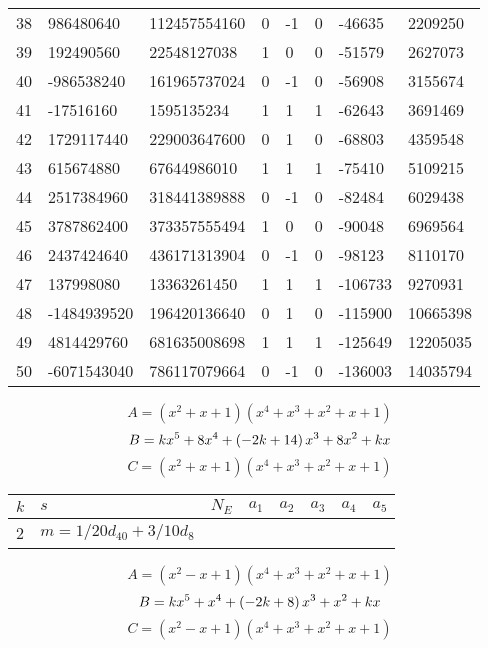 \documentclass{amsart}
\begin{document}
\begin{longtable}{|l|l|l|lllll|}
38&986480640&112457554160&0&-1&0&-46635&2209250\\
39&192490560&22548127038&1&0&0&-51579&2627073\\
40&-986538240&161965737024&0&-1&0&-56908&3155674\\
41&-17516160&1595135234&1&1&1&-62643&3691469\\
42&1729117440&229003647600&0&1&0&-68803&4359548\\
43&615674880&67644986010&1&1&1&-75410&5109215\\
44&2517384960&318441389888&0&-1&0&-82484&6029438\\
45&3787862400&373357555494&1&0&0&-90048&6969564\\
46&2437424640&436171313904&0&-1&0&-98123&8110170\\
47&137998080&13363261450&1&1&1&-106733&9270931\\
48&-1484939520&196420136640&0&1&0&-115900&10665398\\
49&4814429760&681635008698&1&1&1&-125649&12205035\\
50&-6071543040&786117079664&0&-1&0&-136003&14035794\\
\hline
\end{longtable}
$$A=(x^2
 + x
 + 1)(x^4
 + x^3
 + x^2
 + x
 + 1)$$
$$B=k\*x^5
 + 8\*x^4
 + \left(-2\*k
 + 14\right) \*x^3
 + 8\*x^2
 + k\*x$$
$$C=(x^2
 + x
 + 1)(x^4
 + x^3
 + x^2
 + x
 + 1)$$
\begin{longtable}{|l|l|l|lllll|}
\hline
$k$ & $s$ & $N_E$ & $a_1$ & $a_2$ & $a_3$ & $a_4$ & $a_5$\\
\hline
2&$m=1/20d_{40}+3/10d_{8}$&&\multicolumn{5}{c|}{}\\
\hline
\end{longtable}
$$A=(x^2
 - x
 + 1)(x^4
 + x^3
 + x^2
 + x
 + 1)$$
$$B=k\*x^5
 + x^4
 + \left(-2\*k
 + 8\right) \*x^3
 + x^2
 + k\*x$$
$$C=(x^2
 - x
 + 1)(x^4
 + x^3
 + x^2
 + x
 + 1)$$
\end{document}
